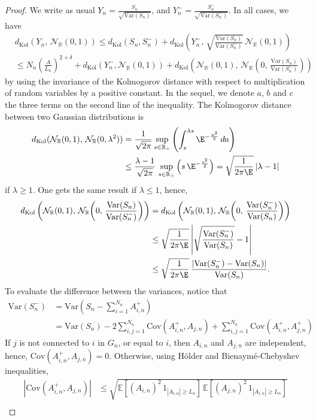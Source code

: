 \documentclass[envcountsame]{svmult}
\newcommand{\R}{\mathbb{R}}
\newcommand{\esper}{\mathbb{E}}
\newcommand{\dkol}{d_\mathrm{Kol}}
\newcommand{\var}{\mathrm{Var}}
\newcommand{\cov}{\mathrm{Cov}}
\newcommand{\gauss}{\mathcal{N}_{\R}(0,1)}
\newcommand{\DD}[1]{\,d\hspace*{-0.3mm}{#1}}
\begin{document}
\begin{proof} 
We write as usual $Y_n = \frac{S_n}{\sqrt{\var(S_n)}}$, and $Y_n^- = \frac{S_n^-}{\sqrt{\var(S_n^-)}}$. In all cases, we have
\begin{align*}
&\dkol(Y_n,\,\gauss) \leq \dkol(S_n,S_n^-) + \dkol\left(Y_n^-,\,\sqrt{\frac{\var(S_n)}{\var(S_n^-)}}\,\gauss\right) \\
&\leq N_n\left(\frac{A}{L_n}\right)^{2+\delta} + \dkol(Y_n^-,\gauss) + \dkol\left(\gauss,\,\mathcal{N}_{\R}\!\left(0,\,\frac{\var(S_n)}{\var(S_n^-)}\right)\right)
\end{align*}
by using the invariance of the Kolmogorov distance with respect to multiplication of random variables by a positive constant. In the sequel, we denote $a$, $b$ and $c$ the three terms on the second line of the inequality.
The Kolmogorov distance between two Gaussian distributions is
\begin{align*}
\dkol(\gauss,\,\mathcal{N}_{\R}(0,\lambda^2)) &= \frac{1}{\sqrt{2\pi}}\sup_{s \in \R_+} \left( \int_{s}^{\lambda s} \E^{-\frac{u^2}{2}}\DD{u} \right)\\
&\leq \frac{\lambda-1}{\sqrt{2\pi}}\,\sup_{s \in \R_+} \left(s\,\E^{-\frac{s^2}{2}}\right) =\sqrt{\frac{1}{2\pi\E}}\,|\lambda-1|
\end{align*}
if $\lambda \geq 1$. One gets the same result if $\lambda \leq 1$, hence, 
\begin{align*}
\dkol\left(\gauss,\,\mathcal{N}_{\R}\!\left(0,\,\frac{\var(S_n)}{\var(S_n^-)}\right)\right) &= \dkol\left(\gauss,\,\mathcal{N}_{\R}\!\left(0,\,\frac{\var(S_n^-)}{\var(S_n)}\right)\right) \\
&\leq \sqrt{\frac{1}{2\pi\E}} \left|\sqrt{\frac{\var(S_n^-)}{\var(S_n)}}-1\right| \\
&\leq \sqrt{\frac{1}{2\pi\E}}\,\frac{|\var(S_n^-)-\var(S_n)|}{\var(S_n)}.
\end{align*}
To evaluate the difference between the variances, notice that
\begin{align*}
\var(S_n^-) &= \var\left(S_n - \sum_{i=1}^{N_n} A_{i,n}^+\right) \\
&=\var(S_n) - 2 \sum_{i,j=1}^{N_n} \cov(A_{i,n}^+,A_{j,n}) + \sum_{i,j=1}^{N_n} \cov(A_{i,n}^+,A_{j,n}^+)
\end{align*}
If $j$ is not connected to $i$ in $G_n$, or equal to $i$, then $A_{i,n}$ and $A_{j,n}$ are independent, hence, $\cov(A_{i,n}^+,A_{j,n})=0$. Otherwise, using H\"older and Bienaym\'e-Chebyshev inequalities,
\begin{align*}
|\cov(A_{i,n}^+,A_{j,n})| &\leq \sqrt{\esper[(A_{i,n})^2\,1_{|A_{i,n}|\geq L_n}]\,\esper[(A_{j,n})^2\,1_{|A_{i,n}|\geq L_n}]} \\

\end{align*}
\end{proof}
\end{document}
